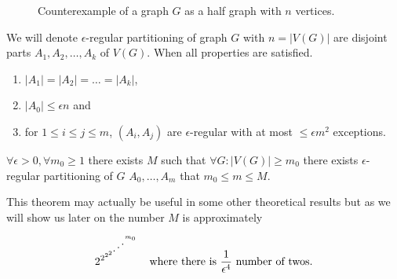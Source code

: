 \begin{figure}
	\caption{Counterexample of a graph $G$ as a half graph with $n$ vertices.}
	\label{half-graph}
\end{figure}

\begin{defn}
	We will denote $\epsilon$-regular partitioning of graph $G$ with $n = |V(G)|$ are disjoint parts $A_{1}, A_{2}, \dots, A_{k}$ of $V(G)$. When all properties are satisfied.
	
	\begin{enumerate}
		\item $|A_1| = |A_2| = \dots = |A_k|$,
		\item $|A_0| \leq \epsilon n$ and
		\item for $1 \leq i \leq j \leq m$, $(A_i, A_j)$ are $\epsilon$-regular with at most $\leq \epsilon m^2$ exceptions.
	\end{enumerate}
\end{defn}

\begin{thm}
	$\forall \epsilon > 0, \forall m_0 \geq 1$ there exists $M$ such that $\forall G : |V(G)| \geq m_0$ there exists $\epsilon$-regular partitioning of $G$ $A_0, \dots, A_m$ that $m_0 \leq m \leq M$.
\end{thm}

This theorem may actually be useful in some other theoretical results but as we will show us later on the number $M$ is approximately

$$
2^{2{^{2^{2^{\reflectbox{$\ddots$}^{m_0}}}}}} \quad \text{where there is } \frac{1}{\epsilon^4} \text{ number of twos.}
$$